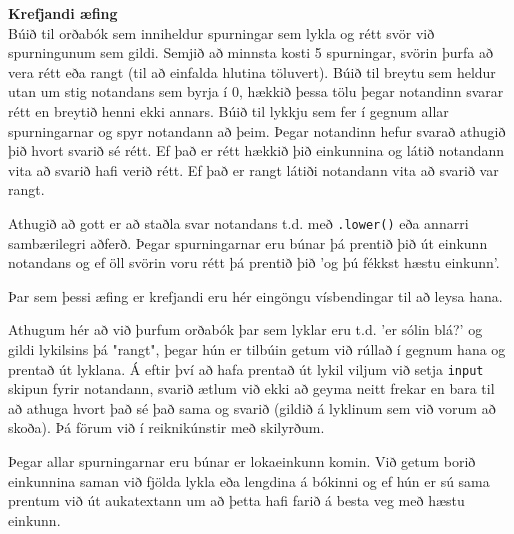 \begin{exercise}\label{dic6}
	\textbf{Krefjandi æfing}\\
	Búið til orðabók sem inniheldur spurningar sem lykla og rétt svör við spurningunum sem gildi. 
	Semjið að minnsta kosti 5 spurningar, svörin þurfa að vera rétt eða rangt (til að einfalda hlutina töluvert).
	Búið til breytu sem heldur utan um stig notandans sem byrja í 0, hækkið þessa tölu þegar notandinn svarar rétt en breytið henni ekki annars. 
	Búið til lykkju sem fer í gegnum allar spurningarnar og spyr notandann að þeim.
	Þegar notandinn hefur svarað athugið þið hvort svarið sé rétt.
	Ef það er rétt hækkið þið einkunnina og látið notandann vita að svarið hafi verið rétt.
	Ef það er rangt látiði notandann vita að svarið var rangt.
	
	Athugið að gott er að staðla svar notandans t.d. með \texttt{.lower()} eða annarri sambærilegri aðferð. 
	Þegar spurningarnar eru búnar þá prentið þið út einkunn notandans og ef öll svörin voru rétt þá prentið þið 'og þú fékkst hæstu einkunn'.
\end{exercise}
\begin{Answer}[ref={dic6}]
	Þar sem þessi æfing er krefjandi eru hér eingöngu vísbendingar til að leysa hana.
	
	Athugum hér að við þurfum orðabók þar sem lyklar eru t.d. 'er sólin blá?' og gildi lykilsins þá "rangt", þegar hún er tilbúin getum við rúllað í gegnum hana og prentað út lyklana.
	Á eftir því að hafa prentað út lykil viljum við setja \texttt{input} skipun fyrir notandann, svarið ætlum við ekki að geyma neitt frekar en bara til að athuga hvort það sé það sama og svarið (gildið á lyklinum sem við vorum að skoða).
	Þá förum við í reiknikúnstir með skilyrðum.
	
	Þegar allar spurningarnar eru búnar er lokaeinkunn komin.
	Við getum borið einkunnina saman við fjölda lykla eða lengdina á bókinni og ef hún er sú sama prentum við út aukatextann um að þetta hafi farið á besta veg með hæstu einkunn.
\end{Answer}

